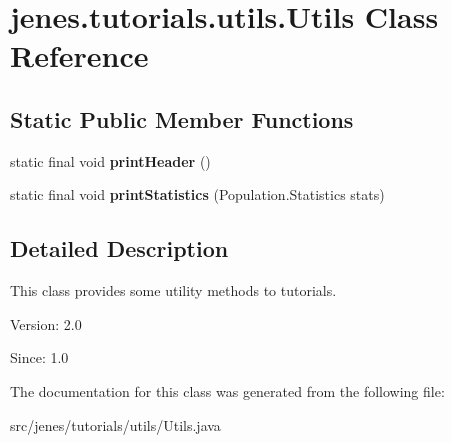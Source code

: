 \hypertarget{classjenes_1_1tutorials_1_1utils_1_1_utils}{
\section{jenes.tutorials.utils.Utils Class Reference}
\label{classjenes_1_1tutorials_1_1utils_1_1_utils}
}
\subsection*{Static Public Member Functions}
\begin{CompactItemize}
\item 
\hypertarget{classjenes_1_1tutorials_1_1utils_1_1_utils_69faf47422bb9677c832496aa7c3b516}{
static final void \textbf{printHeader} ()}
\label{classjenes_1_1tutorials_1_1utils_1_1_utils_69faf47422bb9677c832496aa7c3b516}

\item 
\hypertarget{classjenes_1_1tutorials_1_1utils_1_1_utils_6bee3809d14100994dd942f3d745fa0c}{
static final void \textbf{printStatistics} (Population.Statistics stats)}
\label{classjenes_1_1tutorials_1_1utils_1_1_utils_6bee3809d14100994dd942f3d745fa0c}

\end{CompactItemize}


\subsection{Detailed Description}
This class provides some utility methods to tutorials.

\begin{Desc}
\item[Version:]2.0 \end{Desc}
\begin{Desc}
\item[Since:]1.0 \end{Desc}


The documentation for this class was generated from the following file:\begin{CompactItemize}
\item 
src/jenes/tutorials/utils/Utils.java\end{CompactItemize}
